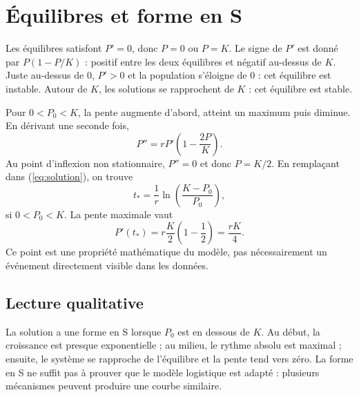 \section{Équilibres et forme en S}
Les équilibres satisfont $P'=0$, donc $P=0$ ou $P=K$. Le signe de $P'$ est donné par $P(1-P/K)$ : positif entre les deux équilibres et négatif au-dessus de $K$. Juste au-dessus de $0$, $P'>0$ et la population s'éloigne de $0$ : cet équilibre est instable. Autour de $K$, les solutions se rapprochent de $K$ : cet équilibre est stable.

\begin{center}
\end{center}

Pour $0<P_0<K$, la pente augmente d'abord, atteint un maximum puis diminue. En dérivant une seconde fois,
\[
 P''=rP'\left(1-\frac{2P}{K}\right).
\]
Au point d'inflexion non stationnaire, $P''=0$ et donc $P=K/2$. En remplaçant dans (\ref{eq:solution}), on trouve
\[
 t_* = \frac1r\ln\left(\frac{K-P_0}{P_0}\right),
\]
si $0<P_0<K$. La pente maximale vaut
\[
 P'(t_*)=r\frac K2\left(1-\frac12\right)=\frac{rK}{4}.
\]
Ce point est une propriété mathématique du modèle, pas nécessairement un événement directement visible dans les données.

\subsection{Lecture qualitative}
La solution a une forme en S lorsque $P_0$ est en dessous de $K$. Au début, la croissance est presque exponentielle ; au milieu, le rythme absolu est maximal ; ensuite, le système se rapproche de l'équilibre et la pente tend vers zéro. La forme en S ne suffit pas à prouver que le modèle logistique est adapté : plusieurs mécanismes peuvent produire une courbe similaire.

